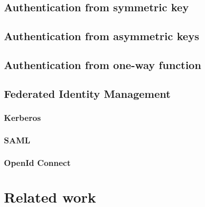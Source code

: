 \subsection{Authentication from symmetric key}
\subsection{Authentication from asymmetric keys}
\subsection{Authentication from one-way function}
\subsection{Federated Identity Management}
\subsubsection{Kerberos}
\subsubsection{SAML}
\subsubsection{OpenId Connect}

\section{Related work}